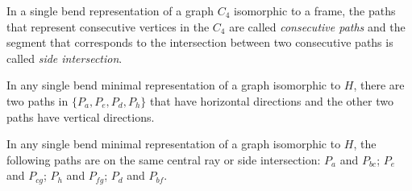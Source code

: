 \documentclass[runningheads]{llncs}
\begin{document}
\begin{definition}
In a single bend representation of a graph $C_4$ isomorphic to a frame, the paths that represent consecutive vertices in the $C_4$ are called \emph{con\-se\-cu\-ti\-ve paths} and the segment that corresponds to the intersection between two consecutive paths is called \emph{side intersection}.  
\end{definition}

\begin{lemma}\label{lem:2vertical2horizontal}
In any single bend minimal representation of a graph isomorphic to $H$, there are two paths in $\{P_a, P_e, P_{d}, P_{h} \}$ that have horizontal directions and the other two paths have vertical directions.
\end{lemma}




\begin{corollary} \label{coro:paresMesmoSegmento}
In any single bend minimal representation of a graph isomorphic to $H$, the following paths are on the same central ray or side intersection: $P_{a}$ and $P_{bc}$; $P_{e}$ and $P_{cg}$; $P_{h}$ and $P_{fg}$; $P_{d}$ and $P_{bf}$.

\end{corollary}
\end{document}

